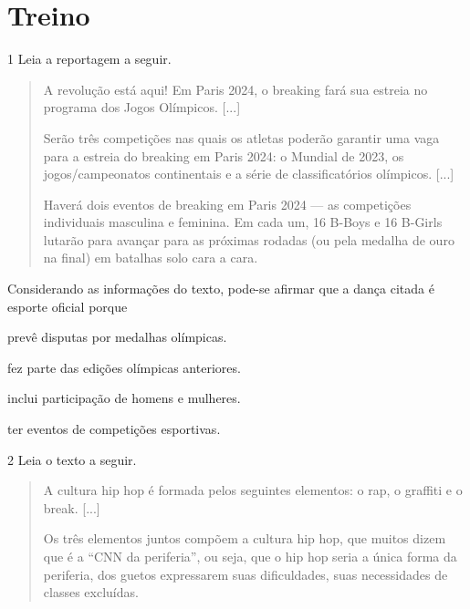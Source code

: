 \section{Treino}

\num{1} Leia a reportagem a seguir.

\begin{quote}
A revolução está aqui! Em Paris 2024, o breaking fará sua
estreia no programa dos Jogos Olímpicos. {[}...{]}

Serão três competições nas quais os atletas poderão garantir uma vaga
para a estreia do breaking em Paris 2024: o Mundial de 2023, os
jogos/campeonatos continentais e a série de classificatórios olímpicos.
{[}...{]}

Haverá dois eventos de breaking em Paris 2024 --- as competições
individuais masculina e feminina. Em cada um, 16 B-Boys e 16 B-Girls
lutarão para avançar para as próximas rodadas (ou pela medalha de ouro
na final) em batalhas solo cara a cara.

\end{quote}

Considerando as informações do texto, pode-se afirmar que a dança citada
é esporte oficial porque

\begin{escolha}
\item prevê disputas por medalhas olímpicas.

\item fez parte das edições olímpicas anteriores.

\item inclui participação de homens e mulheres.

\item ter eventos de competições esportivas.
\end{escolha}


\num{2} Leia o texto a seguir.

\begin{quote}
A cultura hip hop é formada pelos seguintes elementos: o rap, o graffiti
e o break. {[}...{]}

Os três elementos juntos compõem a cultura hip hop, que muitos dizem que
é a ``CNN da periferia'', ou seja, que o hip hop seria a única forma da
periferia, dos guetos expressarem suas dificuldades, suas necessidades
de classes excluídas.

\end{quote}

